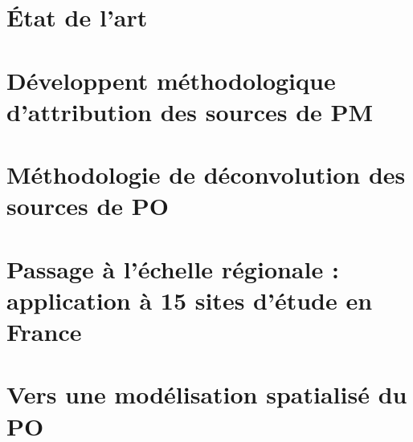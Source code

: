 \documentclass[a4paper,12pt]{book}
\begin{document}
\chapter{État de l'art}
\label{cha:etat_de_lart}
\PartialToc
\clearpage


\chapter{Développent méthodologique d'attribution des sources de PM}
\label{cha:chapter02}
\PartialToc
\clearpage


\chapter{Méthodologie de déconvolution des sources de PO}
\label{cha:methodology_for_the_attribution_of_intrisinc_op_to_a_pm_source}
\PartialToc
\clearpage


\chapter{Passage à l'échelle régionale : application à 15 sites d'étude en France}
\label{cha:application_to_15_sites_in_France}
\PartialToc
\clearpage


\chapter{Vers une modélisation spatialisé du PO}
\label{cha:spatio_temporal_modelizing}
\PartialToc
\clearpage


\printbibliography


\appendix
\setcounter{table}{0}
\setcounter{figure}{0}
\setcounter{equation}{0}
\renewcommand{\thetable}{\thesection-\arabic{table}}
\renewcommand{\thefigure}{\thesection-\arabic{figure}}
\renewcommand{\theequation}{\thesection-\arabic{equation}}
\end{document}
